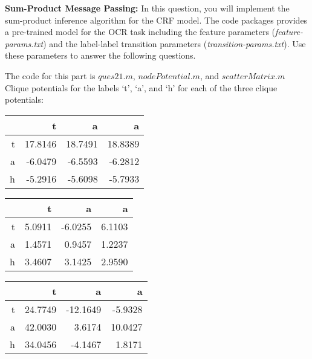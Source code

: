 \documentclass[11pt]{article}
\begin{document}
\begin{problem}{40} \textbf{Sum-Product Message Passing:} In this question, you will implement the sum-product inference algorithm for the CRF model. The code packages provides a pre-trained model for the OCR task including the feature parameters (\textit{feature-params.txt}) and the label-label transition parameters (\textit{transition-params.txt}). Use these parameters to answer the following questions.
 
The code for this part is $ques21.m$, $nodePotential.m$, and $scatterMatrix.m$\\
Clique potentials for the labels `t', `a', and `h' for each of the three clique potentials:

\begin{center}
\begin{tabular}{r|r|r|r}
& t & a & a \\\hline
t & 17.8146 & 18.7491 & 18.8389 \\\hline
a & -6.0479 & -6.5593 & -6.2812 \\\hline
h & -5.2916 & -5.6098 & -5.7933
\end{tabular}
\end{center}

\begin{center}
\begin{tabular}{r|r|r|r}
& t & a & a \\\hline
t & 5.0911 & -6.0255 & 6.1103 \\\hline
a & 1.4571 & 0.9457 & 1.2237 \\\hline
h & 3.4607 & 3.1425 & 2.9590
\end{tabular}
\end{center}

\begin{center}
\begin{tabular}{r|r|r|r}
& t & a & a \\\hline
t & 24.7749 & -12.1649 & -5.9328 \\\hline
a & 42.0030 & 3.6174 & 10.0427 \\\hline
h & 34.0456 & -4.1467 & 1.8171
\end{tabular}
\end{center}


\end{problem}
\end{document}
